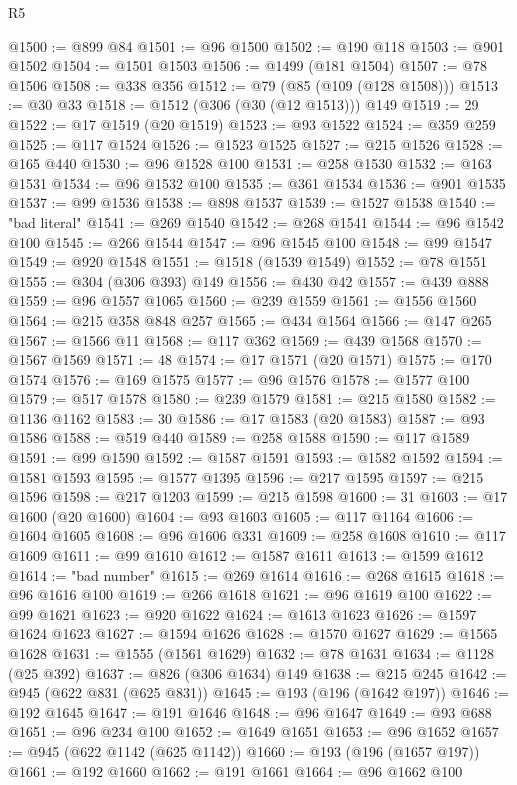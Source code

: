 \begin{lexlean}{R5}
\begin{coremodule}
@1500 := @899 @84
@1501 := @96 @1500
@1502 := @190 @118
@1503 := @901 @1502
@1504 := @1501 @1503
@1506 := @1499 (@181 @1504)
@1507 := @78 @1506
@1508 := @338 @356
@1512 := @79 (@85 (@109 (@128 @1508)))
@1513 := @30 @33
@1518 := @1512 (@306 (@30 (@12 @1513))) @149
@1519 := 29
@1522 := @17 @1519 (@20 @1519)
@1523 := @93 @1522
@1524 := @359 @259
@1525 := @117 @1524
@1526 := @1523 @1525
@1527 := @215 @1526
@1528 := @165 @440
@1530 := @96 @1528 @100
@1531 := @258 @1530
@1532 := @163 @1531
@1534 := @96 @1532 @100
@1535 := @361 @1534
@1536 := @901 @1535
@1537 := @99 @1536
@1538 := @898 @1537
@1539 := @1527 @1538
@1540 := "bad literal"
@1541 := @269 @1540
@1542 := @268 @1541
@1544 := @96 @1542 @100
@1545 := @266 @1544
@1547 := @96 @1545 @100
@1548 := @99 @1547
@1549 := @920 @1548
@1551 := @1518 (@1539 @1549)
@1552 := @78 @1551
@1555 := @304 (@306 @393) @149
@1556 := @430 @42
@1557 := @439 @888
@1559 := @96 @1557 @1065
@1560 := @239 @1559
@1561 := @1556 @1560
@1564 := @215 @358 @848 @257
@1565 := @434 @1564
@1566 := @147 @265
@1567 := @1566 @11
@1568 := @117 @362
@1569 := @439 @1568
@1570 := @1567 @1569
@1571 := 48
@1574 := @17 @1571 (@20 @1571)
@1575 := @170 @1574
@1576 := @169 @1575
@1577 := @96 @1576
@1578 := @1577 @100
@1579 := @517 @1578
@1580 := @239 @1579
@1581 := @215 @1580
@1582 := @1136 @1162
@1583 := 30
@1586 := @17 @1583 (@20 @1583)
@1587 := @93 @1586
@1588 := @519 @440
@1589 := @258 @1588
@1590 := @117 @1589
@1591 := @99 @1590
@1592 := @1587 @1591
@1593 := @1582 @1592
@1594 := @1581 @1593
@1595 := @1577 @1395
@1596 := @217 @1595
@1597 := @215 @1596
@1598 := @217 @1203
@1599 := @215 @1598
@1600 := 31
@1603 := @17 @1600 (@20 @1600)
@1604 := @93 @1603
@1605 := @117 @1164
@1606 := @1604 @1605
@1608 := @96 @1606 @331
@1609 := @258 @1608
@1610 := @117 @1609
@1611 := @99 @1610
@1612 := @1587 @1611
@1613 := @1599 @1612
@1614 := "bad number"
@1615 := @269 @1614
@1616 := @268 @1615
@1618 := @96 @1616 @100
@1619 := @266 @1618
@1621 := @96 @1619 @100
@1622 := @99 @1621
@1623 := @920 @1622
@1624 := @1613 @1623
@1626 := @1597 @1624 @1623
@1627 := @1594 @1626
@1628 := @1570 @1627
@1629 := @1565 @1628
@1631 := @1555 (@1561 @1629)
@1632 := @78 @1631
@1634 := @1128 (@25 @392)
@1637 := @826 (@306 @1634) @149
@1638 := @215 @245
@1642 := @945 (@622 @831 (@625 @831))
@1645 := @193 (@196 (@1642 @197))
@1646 := @192 @1645
@1647 := @191 @1646
@1648 := @96 @1647
@1649 := @93 @688
@1651 := @96 @234 @100
@1652 := @1649 @1651
@1653 := @96 @1652
@1657 := @945 (@622 @1142 (@625 @1142))
@1660 := @193 (@196 (@1657 @197))
@1661 := @192 @1660
@1662 := @191 @1661
@1664 := @96 @1662 @100

\end{coremodule}
\end{lexlean}
